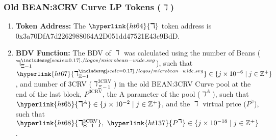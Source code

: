 \documentclass[class=article, crop=false]{standalone}
\begin{document}
\subsubsection{Old BEAN:3CRV Curve LP Tokens ($\daleth$)}
    \begin{enumerate}
        \item \textbf{Token Address:} The $\hyperlink{ht64}{\daleth}$ token address is 0x3a70DfA7d2262988064A2D051dd47521E43c9BdD.
        \item \textbf{BDV Function:} The BDV of \hyperlink{ht64}{$\daleth$} was calculated using the number of Beans (\hyperlink{ht67}{$\daleth_{\Xi-1}^{\bean}$}), such that $\hyperlink{ht67}{\daleth_{\Xi-1}^{\bean}} \in \{j \times 10^{-6} \mid j \in \mathbb{Z}^{+} \}$, and number of 3CRV (\hyperlink{ht68}{$\daleth_{\Xi-1}^{\text{3CRV}}$}) in the old BEAN:3CRV Curve pool at the end of the last block, \hyperlink{ht136}{$P^{\text{3CRV}}$}, the A parameter of the pool (\hyperlink{ht65}{$\daleth^{A}$}), such that $\hyperlink{ht65}{\daleth^{A}} \in \{j \times 10^{-2} \mid j \in \mathbb{Z}^{+} \}$, and the \hyperlink{ht64}{$\daleth$} virtual price (\hyperlink{ht137}{$P^{\daleth}$}), such that $\hyperlink{ht68}{\daleth_{\Xi-1}^{\text{3CRV}}},\ \hyperlink{ht137}{P^{\daleth}} \in \{j \times 10^{-18} \mid j \in \mathbb{Z}^{+} \}$. 


\end{enumerate}
\end{document}
